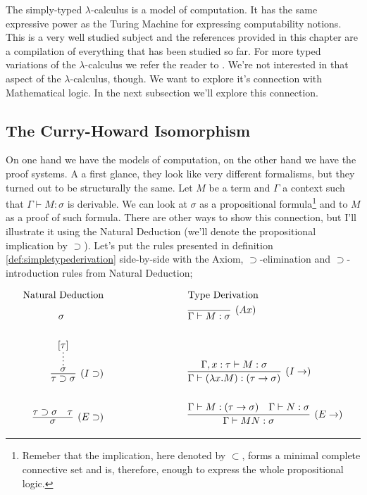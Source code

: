 The simply-typed $\lambda$-calculus is a model of computation. It has the same expressive power as
the Turing Machine for expressing computability notions. This is a very well studied subject
and the references provided in this chapter are a compilation of everything that
has been studied so far. For more typed variations of the $\lambda$-calculus we refer the reader
to \cite{Barendregt03}. We're not interested in that aspect of the $\lambda$-calculus, 
though. We want to explore it's connection with Mathematical logic. In the next subsection
we'll explore this connection.

\subsection{The Curry-Howard Isomorphism}

On one hand we have the models of computation, on the other hand we have the proof systems.
A a first glance, they look like very different formalisms, but they turned out to be
structurally the same. Let $M$ be a term and $\Gamma$ a context such that
$\Gamma \vdash M : \sigma$ is derivable. We can look at $\sigma$ as a propositional formula\footnote{
Remeber that the implication, here denoted by $\subset$, forms a minimal complete connective set
and is, therefore, enough to express the whole propositional logic.
} and to $M$ as a proof of such formula. There are other ways to show this connection,
but I'll illustrate it using the Natural Deduction\cite{Prawitz01} (we'll denote the
propositional implication by $\supset$). Let's put the rules presented in definition
\ref{def:simpletypederivation} side-by-side with the Axiom, $\supset$-elimination and
$\supset$-introduction rules from Natural Deduction;

\begin{center}
\begin{align*}
	\text{Natural Deduction} & \hspace{3cm} \text{Type Derivation} \\
	\sigma \hspace{1.4cm} & \hspace{3cm} \infer[(Ax)]{\Gamma \vdash M : \sigma}{}  \\[0.5cm]
	\infer[(I\supset)]{\tau \supset \sigma}{\infer*{\sigma}{[\tau]}}
		& \hspace{3cm} 
		\infer[(I\rightarrow)]{\Gamma \vdash (\lambda x . M) : (\tau \rightarrow \sigma)}
							  {\Gamma, x:\tau \vdash M : \sigma} \\[0.5cm]					  
	\infer[(E\supset)]{\sigma}{\tau \supset \sigma & \tau}
		& \hspace{3cm}
		\infer[(E\rightarrow)]{\Gamma \vdash MN : \sigma}
			{ \Gamma \vdash M : (\tau \rightarrow \sigma) & \Gamma \vdash N : \sigma}
\end{align*} 
\end{center}

